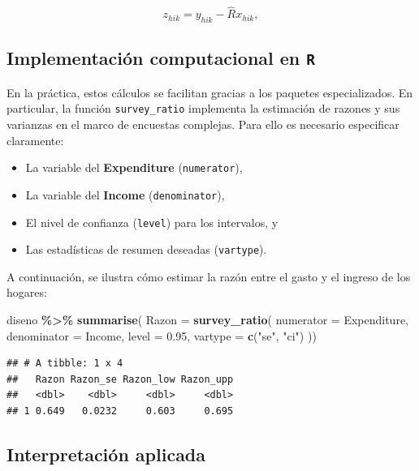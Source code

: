 \documentclass[
  spanish,
  12pt,
]{book}
\newenvironment{Shaded}{\begin{snugshade}}{\end{snugshade}}
\newcommand{\AttributeTok}[1]{\textcolor[rgb]{0.13,0.29,0.53}{#1}}
\newcommand{\FloatTok}[1]{\textcolor[rgb]{0.00,0.00,0.81}{#1}}
\newcommand{\FunctionTok}[1]{\textcolor[rgb]{0.13,0.29,0.53}{\textbf{#1}}}
\newcommand{\NormalTok}[1]{#1}
\newcommand{\SpecialCharTok}[1]{\textcolor[rgb]{0.81,0.36,0.00}{\textbf{#1}}}
\newcommand{\StringTok}[1]{\textcolor[rgb]{0.31,0.60,0.02}{#1}}
\providecommand{\tightlist}{%
  \setlength{\itemsep}{0pt}\setlength{\parskip}{0pt}}
\begin{document}
\[
z_{hik} = y_{hik} - \hat{R}x_{hik},
\]

\subsection*{\texorpdfstring{Implementación computacional en \texttt{R}}{Implementación computacional en R}}\label{implementaciuxf3n-computacional-en-r}

En la práctica, estos cálculos se facilitan gracias a los paquetes especializados. En particular, la función \texttt{survey\_ratio} implementa la estimación de razones y sus varianzas en el marco de encuestas complejas. Para ello es necesario especificar claramente:

\begin{itemize}
\tightlist
\item
  La variable del \textbf{Expenditure} (\texttt{numerator}),
\item
  La variable del \textbf{Income} (\texttt{denominator}),
\item
  El nivel de confianza (\texttt{level}) para los intervalos, y
\item
  Las estadísticas de resumen deseadas (\texttt{vartype}).
\end{itemize}

A continuación, se ilustra cómo estimar la razón entre el gasto y el ingreso de los hogares:

\begin{Shaded}
\begin{Highlighting}[]
\NormalTok{diseno }\SpecialCharTok{\%\textgreater{}\%} \FunctionTok{summarise}\NormalTok{(}
    \AttributeTok{Razon =}  \FunctionTok{survey\_ratio}\NormalTok{(}
      \AttributeTok{numerator =}\NormalTok{ Expenditure,}
      \AttributeTok{denominator =}\NormalTok{ Income,}
      \AttributeTok{level =} \FloatTok{0.95}\NormalTok{,}
    \AttributeTok{vartype =}  \FunctionTok{c}\NormalTok{(}\StringTok{"se"}\NormalTok{, }\StringTok{"ci"}\NormalTok{)}
\NormalTok{    ))}
\end{Highlighting}
\end{Shaded}

\begin{verbatim}
## # A tibble: 1 x 4
##   Razon Razon_se Razon_low Razon_upp
##   <dbl>    <dbl>     <dbl>     <dbl>
## 1 0.649   0.0232     0.603     0.695
\end{verbatim}

\subsection*{Interpretación aplicada}\label{interpretaciuxf3n-aplicada}
\end{document}
